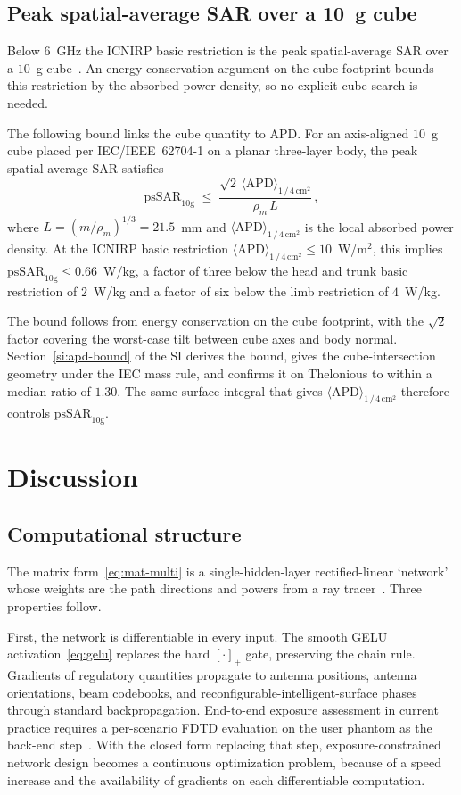 \documentclass[journal,twocolumn,10pt]{IEEEtran}
\newcommand{\APDAvg}{\langle\mathrm{APD}\rangle_{1\,/\,4\,\mathrm{cm}^2}}
\begin{document}
\subsection{Peak spatial-average SAR over a 10~g cube}\label{subsec:compl-cube}

Below $6$~GHz the ICNIRP basic restriction is the peak spatial-average
SAR over a $10$~g cube~\cite{ICNIRP2020,62704-1}. An
energy-conservation argument on the cube footprint bounds this
restriction by the absorbed power density, so no explicit cube search
is needed.

The following bound links the cube quantity to APD. For an axis-aligned
$10$~g cube placed per IEC/IEEE~62704-1 on a planar
three-layer body, the peak spatial-average SAR satisfies
\begin{equation}\label{eq:apd-bound}
  \mathrm{psSAR}_{10\mathrm{g}}
  \;\le\; \frac{\sqrt{2}\,\APDAvg}{\rho_m\,L}\, ,
\end{equation}
where $L = (m/\rho_m)^{1/3} = 21.5$~mm and $\APDAvg$ is the local
absorbed power density. At the ICNIRP basic restriction
$\APDAvg \le 10$~W/m$^2$, this implies
$\mathrm{psSAR}_{10\mathrm{g}} \le 0.66$~W/kg, a factor of three below
the head and trunk basic restriction of $2$~W/kg and a factor of six
below the limb restriction of $4$~W/kg.

The bound follows from energy conservation on the cube footprint,
with the $\sqrt{2}$ factor covering the worst-case tilt between cube
axes and body normal. Section~\ref{si:apd-bound} of the SI derives the bound,
gives the cube-intersection geometry under the IEC mass rule, and
confirms it on Thelonious to within a median ratio of $1.30$. The same
surface integral that gives $\APDAvg$ therefore controls
$\mathrm{psSAR}_{10\mathrm{g}}$.

\section{Discussion}\label{sec:disc}

\subsection{Computational structure}\label{subsec:disc-primitives}

The matrix form~\eqref{eq:mat-multi} is a single-hidden-layer
rectified-linear `network' whose weights are the path directions and
powers from a ray tracer~\cite{SionnaRT}. Three properties follow.

First, the network is differentiable in every input. The smooth
\gls{GELU} activation~\eqref{eq:gelu} replaces the hard $[\cdot]_+$
gate, preserving the chain rule. Gradients of
regulatory quantities propagate to antenna positions, antenna
orientations, beam codebooks, and reconfigurable-intelligent-surface
phases through standard backpropagation.
End-to-end exposure assessment in current practice requires a
per-scenario FDTD evaluation on the user phantom as the back-end
step~\cite{Wydaeghe2022access,Wydaeghe2026npj}. With the closed form
replacing that step, exposure-constrained network design becomes a
continuous optimization problem, because of a speed increase and the
availability of gradients on each differentiable computation.
\end{document}
